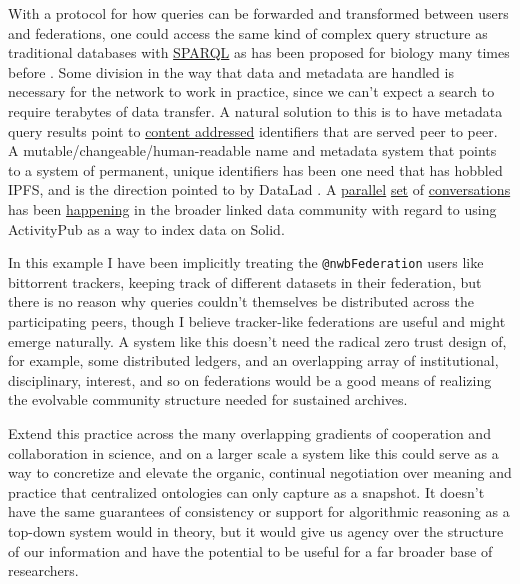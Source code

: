 \documentclass[10pt]{article}
\begin{document}
\begin{multicols}{2}
With a protocol for how queries can be forwarded and transformed between
users and federations, one could access the same kind of complex query
structure as traditional databases with
\href{https://www.w3.org/TR/sparql11-federated-query/}{SPARQL} \cite{SPARQLFederatedQuery2013}  as has been proposed for biology many
times before \cite{simaEnablingSemanticQueries2019, djokic-petrovicPIBASFedSPARQLWebbased2017, hasnainBioFedFederatedQuery2017} . Some division in the way that data
and metadata are handled is necessary for the network to work in
practice, since we can't expect a search to require terabytes of data
transfer. A natural solution to this is to have metadata query results
point to
\href{https://en.wikipedia.org/wiki/Content-addressable_storage}{content
addressed} identifiers that are served peer to peer. A
mutable/changeable/human-readable name and metadata system that points
to a system of permanent, unique identifiers has been one need that has
hobbled IPFS, and is the direction pointed to by DataLad \cite{hankeDefenseDecentralizedResearch2021} . A
\href{https://mastodon.social/@humanetech/107155144840782386}{parallel}
\href{https://web.archive.org/web/20211024082055/https://socialhub.activitypub.rocks/t/which-links-between-activitypub-and-solid-project/529}{set}
of
\href{https://web.archive.org/web/20211024080845/https://socialhub.activitypub.rocks/t/how-solid-and-activitypub-complement-each-other-best/727}{conversations}
has been
\href{https://web.archive.org/web/20211024081238/https://forum.solidproject.org/t/discussion-solid-vs-activitypub/2685}{happening}
in the broader linked data community with regard to using ActivityPub as
a way to index data on Solid.

In this example I have been implicitly treating the
\texttt{@nwbFederation} users like bittorrent trackers, keeping track of
different datasets in their federation, but there is no reason why
queries couldn't themselves be distributed across the participating
peers, though I believe tracker-like federations are useful and might
emerge naturally. A system like this doesn't need the radical zero trust
design of, for example, some distributed ledgers, and an overlapping
array of institutional, disciplinary, interest, and so on federations
would be a good means of realizing the evolvable community structure
needed for sustained archives.

Extend this practice across the many overlapping gradients of
cooperation and collaboration in science, and on a larger scale a system
like this could serve as a way to concretize and elevate the organic,
continual negotiation over meaning and practice that centralized
ontologies can only capture as a snapshot. It doesn't have the same
guarantees of consistency or support for algorithmic reasoning as a
top-down system would in theory, but it would give us agency over the
structure of our information and have the potential to be useful for a
far broader base of researchers.


\end{multicols}
\end{document}
